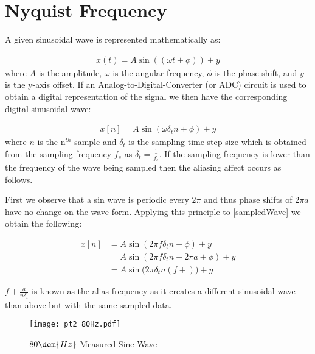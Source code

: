 \documentclass[main.tex]{subfile}
\begin{document}
\section{Nyquist Frequency} 
\label{sec:nyquist_frequency}

A given sinusoidal wave is represented mathematically as:

\begin{align}
  x(t) = A\sin{((\omega t + \phi))} + y
\end{align}
where $A$ is the amplitude, $\omega$ is the angular frequency, $\phi$ is the
phase shift, and $y$ is the y-axis offset. If an Analog-to-Digital-Converter (or
ADC) circuit is used to obtain a digital representation of the signal we then
have the corresponding digital sinusoidal wave: 

\begin{align}
  x[n] = A\sin{(\omega \delta_{t} n + \phi)} + y \label{eq:sampledWave}
\end{align}
where $n$ is the n$^{th}$ sample and $\delta_{t}$ is the sampling time step size
which is obtained from the sampling frequency $f_s$ as $\delta_{t} =
\frac{1}{f_s}$. If the sampling frequency is lower than the frequency of the
wave being sampled then the aliasing affect occurs as follows.

First we observe that a sin wave is periodic every $2\pi$ and thus phase shifts
of $2\pi a$ have no change on the wave form. Applying this principle to \eqref{sampledWave}
we obtain the following:

\begin{align}
  x[n] &= A\sin{(2\pi f \delta_{t} n + \phi)} + y \label{eq:sampledWave}
  \\&= A\sin{(2\pi f \delta_{t} n + 2\pi a + \phi)} + y
  \\&= A\sin{(2\pi \delta_{t} n (f + )}) + y
\end{align}

$f + \frac{a}{n\delta_{t}}$ is known as the alias frequency as it creates a different
sinusoidal wave than above but with the same sampled data.


\begin{figure}[H]
  \begin{center}
    \texttt{[image: pt2\_80Hz.pdf]}
  \end{center}
  \caption{$80\dem{Hz}$ Measured Sine Wave}
  \label{fig:pt280hz}
\end{figure}
\end{document}
